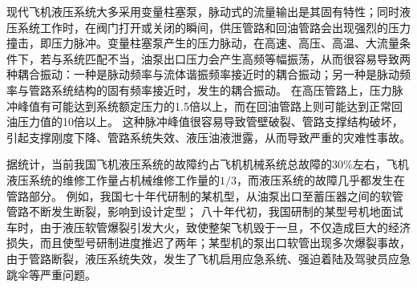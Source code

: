 现代飞机液压系统大多采用变量柱塞泵，脉动式的流量输出是其固有特性；同时液压系统工作时，在阀门打开或关闭的瞬间，供压管路和回油管路会出现强烈的压力撞击，即压力脉冲。变量柱塞泵产生的压力脉动，在高速、高压、高温、大流量条件下，若与系统匹配不当，油泵出口压力会产生高频等幅振荡，从而很容易导致两种耦合振动：一种是脉动频率与流体谐振频率接近时的耦合振动；另一种是脉动频率与管路系统结构的固有频率接近时，发生的耦合振动。
在高压管路上，压力脉冲峰值有可能达到系统额定压力的1.5倍以上，而在回油管路上则可能达到正常回油压力值的10倍以上\cite{lijun2007}。
这种脉冲峰值很容易导致管壁破裂、管路支撑结构破坏，引起支撑刚度下降、管路系统失效、液压油液泄露，从而导致严重的灾难性事故\cite{gaofeng2013}。


据统计，当前我国飞机液压系统的故障约占飞机机械系统总故障的$ 30\%$左右，飞机液压系统的维修工作量占机械维修工作量的$1/3 $\cite{lijun2007}，而液压系统的故障几乎都发生在管路部分。
例如，我国七十年代研制的某机型，从油泵出口至蓄压器之间的软管管路不断发生断裂，影响到设计定型；
八十年代初，我国研制的某型号机地面试车时，由于液压软管爆裂引发大火，致使整架飞机毁于一旦，不仅造成巨大的经济损失，而且使型号研制进度推迟了两年；某型机的泵出口软管出现多次爆裂事故，由于管路断裂，液压系统失效，发生了飞机启用应急系统、强迫着陆及驾驶员应急跳伞等严重问题\cite{lijun2007,guoqing2010,gaofeng2013}。

\begin{figure}
	\centering
	\hspace{1cm}
	\label{fig:plane-hose}
\end{figure}




